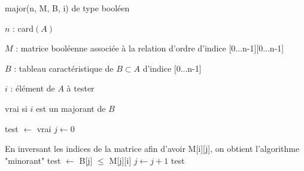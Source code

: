 \documentclass[a4paper,12pt]{article}
\begin{document}
\begin{algorithm}
	\caption{major(n, M, B, i) de type booléen}
	\begin{algorithmic}[1]

	\Require 

	$n$ : card$(A)$

	$M$ : matrice booléenne associée à  la relation d'ordre d'indice [0...n-1][0...n-1]

	$B$ : tableau caractéristique de $B\subset A$ d'indice [0...n-1]

	$i$ : élément de $A$ à  tester
\Ensure 

	vrai si $i$ est un majorant de $B$

\Begin
		\State test $\leftarrow$ vrai
		\State $j \leftarrow 0$
		
		
			\Comment En inversant les indices de la matrice afin d'avoir M[i][j], on obtient l'algorithme "minorant"
			\State test $\leftarrow$ B[j] $\leq$ M[j][i]
			\State $j \leftarrow j + 1$
		\EndWhile
	\EndIf
	\State \Return test
\EndBegin
	\end{algorithmic}
\end{algorithm}
\end{document}
